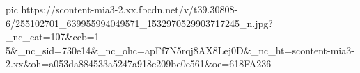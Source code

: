  
 
 
 
 

\ifcmt
  pic https://scontent-mia3-2.xx.fbcdn.net/v/t39.30808-6/255102701_639955994049571_1532970529903717245_n.jpg?_nc_cat=107&ccb=1-5&_nc_sid=730e14&_nc_ohc=apFf7N5rqj8AX8Lej0D&_nc_ht=scontent-mia3-2.xx&oh=a053da884533a5247a918c209be0e561&oe=618FA236
\fi
